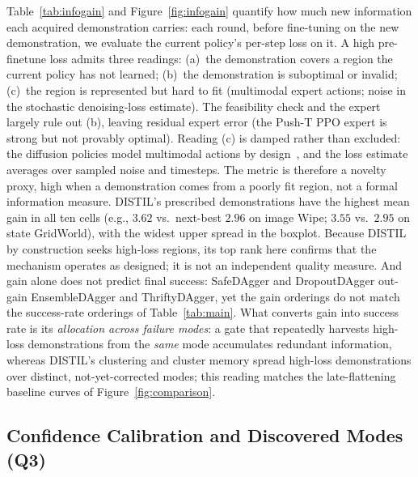 \documentclass[letterpaper]{article} %
\begin{document}
Table~\ref{tab:infogain} and Figure~\ref{fig:infogain} quantify how much new
information each acquired demonstration carries: each round, before
fine-tuning on the new demonstration, we evaluate the current policy's
per-step loss on it. A high pre-finetune loss admits three
readings: (a)~the demonstration covers a region the current policy has not
learned; (b)~the demonstration is suboptimal or invalid; (c)~the region is
represented but hard to fit (multimodal expert actions; noise in the
stochastic denoising-loss estimate). The feasibility check and the expert
largely rule out (b), leaving residual expert error (the Push-T PPO expert
is strong but not provably optimal). Reading (c) is damped rather than
excluded: the diffusion policies model multimodal actions by
design~\citep{chi2023diffusionpolicy}, and the loss estimate averages over
sampled noise and timesteps. The metric is therefore a novelty proxy, high
when a demonstration comes from a poorly fit region, not a formal
information measure. DISTIL's
prescribed demonstrations have the highest mean gain in all ten
cells (e.g., $3.62$ vs.\ next-best $2.96$ on image Wipe; $3.55$ vs.\ $2.95$
on state GridWorld), with the widest upper spread in the boxplot. Because
DISTIL by construction seeks high-loss regions, its top rank here confirms
that the mechanism operates as designed; it is not an independent quality
measure. And gain alone does not predict final success: SafeDAgger and
DropoutDAgger out-gain EnsembleDAgger and ThriftyDAgger, yet the gain
orderings do not match the success-rate orderings of Table~\ref{tab:main}.
What converts gain into success rate is its \emph{allocation
across failure modes}: a gate that repeatedly harvests high-loss
demonstrations from the \emph{same} mode accumulates redundant information,
whereas DISTIL's clustering and cluster memory spread high-loss
demonstrations over distinct, not-yet-corrected modes; this reading
matches the late-flattening baseline curves of
Figure~\ref{fig:comparison}.

\subsection{Confidence Calibration and Discovered Modes (Q3)}
\end{document}
